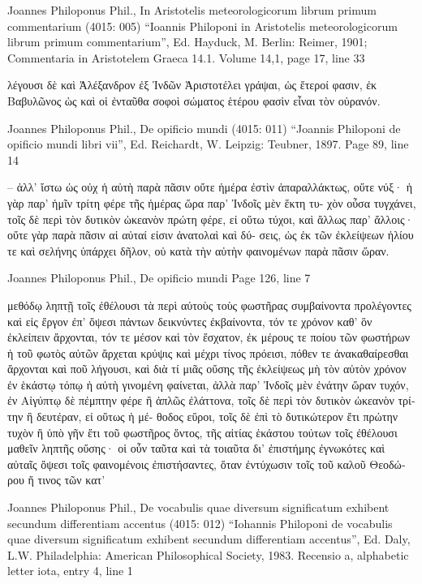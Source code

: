 \documentclass[12pt,letterpaper,twoside,final]{memoir}
\begin{document}
\begin{greek}

Joannes Philoponus Phil., In Aristotelis meteorologicorum librum primum commentarium (4015: 005)
“Ioannis Philoponi in Aristotelis meteorologicorum librum primum commentarium”, Ed. Hayduck, M.
Berlin: Reimer, 1901; Commentaria in Aristotelem Graeca 14.1.
Volume 14,1, page 17, line 33

λέγουσι δὲ καὶ Ἀλέξανδρον ἐξ Ἰνδῶν Ἀριστοτέλει γράψαι, ὡς ἕτεροί φασιν, 
ἐκ Βαβυλῶνος ὡς καὶ οἱ ἐνταῦθα σοφοὶ σώματος ἑτέρου φασὶν εἶναι τὸν 
οὐρανόν. 





Joannes Philoponus Phil., De opificio mundi (4015: 011)
“Joannis Philoponi de opificio mundi libri vii”, Ed. Reichardt, W.
Leipzig: Teubner, 1897.
Page 89, line 14

       – ἀλλ' ἴστω ὡς οὐχ ἡ αὐτὴ παρὰ πᾶσιν οὔτε 
ἡμέρα ἐστὶν ἀπαραλλάκτως, οὔτε νύξ· ἡ γὰρ παρ' ἡμῖν 
τρίτη φέρε τῆς ἡμέρας ὥρα παρ' Ἰνδοῖς μὲν ἕκτη τυ-
χὸν οὖσα τυγχάνει, τοῖς δὲ περὶ τὸν δυτικὸν ὠκεανὸν 
πρώτη φέρε, εἰ οὕτω τύχοι, καὶ ἄλλως παρ' ἄλλοις· 
οὔτε γὰρ παρὰ πᾶσιν αἱ αὐταί εἰσιν ἀνατολαὶ καὶ δύ-
σεις, ὡς ἐκ τῶν ἐκλείψεων ἡλίου τε καὶ σελήνης 
ὑπάρχει δῆλον, οὐ κατὰ τὴν αὐτὴν φαινομένων παρὰ 
πᾶσιν ὥραν. 



Joannes Philoponus Phil., De opificio mundi 
Page 126, line 7

μεθόδῳ ληπτῇ τοῖς ἐθέλουσι τὰ περὶ αὐτοὺς τοὺς 
φωστῆρας συμβαίνοντα προλέγοντες καὶ εἰς ἔργον ἐπ' 
ὄψεσι πάντων δεικνύντες ἐκβαίνοντα, τόν τε χρόνον   
καθ' ὃν ἐκλείπειν ἄρχονται, τόν τε μέσον καὶ τὸν 
ἔσχατον, ἐκ μέρους τε ποίου τῶν φωστήρων ἡ τοῦ 
φωτὸς αὐτῶν ἄρχεται κρύψις καὶ μέχρι τίνος πρόεισι, 
πόθεν τε ἀνακαθαίρεσθαι ἄρχονται καὶ ποῦ λήγουσι, 
καὶ διὰ τί μιᾶς οὔσης τῆς ἐκλείψεως μὴ τὸν αὐτὸν 
χρόνον ἐν ἑκάστῳ τόπῳ ἡ αὐτὴ γινομένη φαίνεται, 
ἀλλὰ παρ' Ἰνδοῖς μὲν ἐνάτην ὥραν τυχόν, ἐν Αἰγύπτῳ 
δὲ πέμπτην φέρε ἢ ἁπλῶς ἐλάττονα, τοῖς δὲ περὶ τὸν 
δυτικὸν ὠκεανὸν τρίτην ἢ δευτέραν, εἰ οὕτως ἡ μέ-
θοδος εὕροι, τοῖς δὲ ἐπὶ τὸ δυτικώτερον ἔτι πρώτην 
τυχὸν ἢ ὑπὸ γῆν ἔτι τοῦ φωστῆρος ὄντος, τῆς αἰτίας 
ἑκάστου τούτων τοῖς ἐθέλουσι μαθεῖν ληπτῆς οὔσης· 
οἱ οὖν ταῦτα καὶ τὰ τοιαῦτα δι' ἐπιστήμης ἐγνωκότες 
καὶ αὐταῖς ὄψεσι τοῖς φαινομένοις ἐπιστήσαντες, ὅταν 
ἐντύχωσιν τοῖς τοῦ καλοῦ Θεοδώρου ἤ τινος τῶν κατ' 




Joannes Philoponus Phil., De vocabulis quae diversum significatum exhibent secundum differentiam accentus (4015: 012)
“Iohannis Philoponi de vocabulis quae diversum significatum exhibent secundum differentiam accentus”, Ed. Daly, L.W.
Philadelphia: American Philosophical Society, 1983.
Recensio a, alphabetic letter iota, entry 4, line 1


\end{greek}
\end{document}
